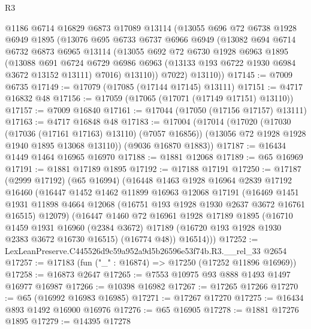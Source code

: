 \begin{lexlean}{R3}
\begin{coremodule}
      @1186
      @6714
      @16829
      @6873
      @17089
      @13114
      (@13055
        @696
        @72
        @6738
        @1928
        @6949
        @1895
        (@13076
          @695
          @6733
          @6737
          @6966
          @6949
          (@13082
            @694
            @6714
            @6732
            @6873
            @6965
            @13114
            (@13055
              @692
              @72
              @6730
              @1928
              @6963
              @1895
              (@13088
                @691
                @6724
                @6729
                @6986
                @6963
                (@13133 @193 @6722 @1930 @6984 @3672 @13152 @13111)
                @7016)
              @13110))
          @7022)
        @13110))
@17145 := @7009 @6735
@17149 := @17079 (@17085 (@17144 @17145) @13111)
@17151 := @4717 @16832 @48
@17156 := @17059 (@17065 (@17071 (@17149 @17151) @13110))
@17157 := @7009 @16840
@17161 := @17044 (@17050 (@17156 @17157) @13111)
@17163 := @4717 @16848 @48
@17183 := @17004
    (@17014
      (@17020
        (@17030 (@17036 (@17161 @17163) @13110) (@7057 @16856))
        (@13056 @72 @1928 @1928 @1940 @1895 @13068 @13110))
      (@9036 @16870 @1883))
@17187 := @16434 @1449 @1464 @16965 @16970
@17188 := @1881 @12068
@17189 := @65 @16969
@17191 := @1881 @17189 @1895
@17192 := @17188 @17191
@17250 := @17187
    (@2999 @17192)
    (@65 @16994)
    (@16448
      @1463
      @1928
      @16964
      @2839
      @17192
      @16460
      (@16447
        @1452
        @1462
        @11899
        @16963
        @12068
        @17191
        (@16469
          @1451
          @1931
          @11898
          @4664
          @12068
          (@16751 @193 @1928 @1930 @2637 @3672 @16761 @16515)
          @12079)
        (@16447
          @1460
          @72
          @16961
          @1928
          @17189
          @1895
          (@16710
            @1459
            @1931
            @16960
            (@2384 @3672)
            @17189
            (@16720 @193 @1928 @1930 @2383 @3672 @16730 @16515)
            (@16774 @48))
          @16514)))
@17252 := LexLeanPreserve.C445526d9c59a952a9d5b26596e53f74b.R3.__rel_33 @2654
@17257 := @17183 (fun ("_" : @16874) => @17250 (@17252 @11896 @16969))
@17258 := @16873 @2647
@17265 := @7553 @10975 @93 @888 @1493 @1497 @16977 @16987
@17266 := @10398 @16982
@17267 := @17265 @17266
@17270 := @65 (@16992 @16983 @16985)
@17271 := @17267 @17270
@17275 := @16434 @893 @1492 @16900 @16976
@17276 := @65 @16905
@17278 := @1881 @17276 @1895
@17279 := @14395 @17278

\end{coremodule}
\end{lexlean}

